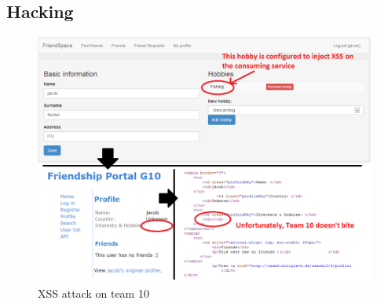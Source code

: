 \documentclass[a4paper]{article}
\begin{document}
\subsection{Hacking}
\begin{figure}[h!]
\centering
\includegraphics[scale=0.3]{Team10_XSS}
\caption{XSS attack on team 10}
\label{fig:xss_screencap}
\end{figure}


\end{document}
